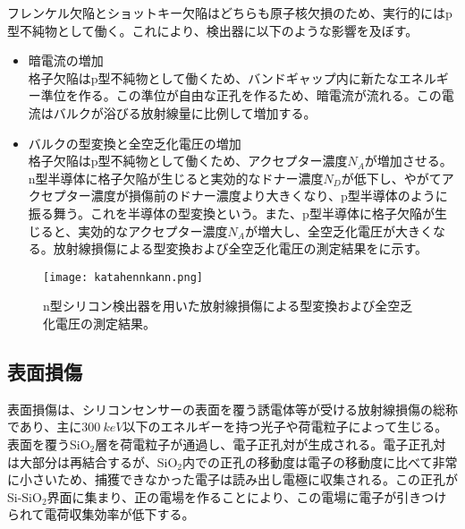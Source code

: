 フレンケル欠陥とショットキー欠陥はどちらも原子核欠損のため、実行的にはp型不純物として働く。これにより、検出器に以下のような影響を及ぼす。
\begin{itemize}
  \item 暗電流の増加\\
  格子欠陥はp型不純物として働くため、バンドギャップ内に新たなエネルギー準位を作る。この準位が自由な正孔を作るため、暗電流が流れる。この電流はバルクが浴びる放射線量に比例して増加する。
  \item バルクの型変換と全空乏化電圧の増加\\
  格子欠陥はp型不純物として働くため、アクセプター濃度$N_A$が増加させる。n型半導体に格子欠陥が生じると実効的なドナー濃度$N_D$が低下し、やがてアクセプター濃度が損傷前のドナー濃度より大きくなり、p型半導体のように振る舞う。これを半導体の型変換という。また、p型半導体に格子欠陥が生じると、実効的なアクセプター濃度$N_A$が増大し、全空乏化電圧が大きくなる。放射線損傷による型変換および全空乏化電圧の測定結果をに示す。
\end{itemize}
\begin{figure}[tbp]
  \centering
  \texttt{[image: katahennkann.png]}
  \caption[放射線損傷による型変換および全空乏化電圧の測定結果]{n型シリコン検出器を用いた放射線損傷による型変換および全空乏化電圧の測定結果\cite{typeinversion}。}
  \label{fig:katahennkann}
\end{figure}



\subsection{表面損傷}
\label{sec:hyoumen}
表面損傷は、シリコンセンサーの表面を覆う誘電体等が受ける放射線損傷の総称であり、主に$300\ \si{keV}$以下のエネルギーを持つ光子や荷電粒子によって生じる。表面を覆うSiO$_2$層を荷電粒子が通過し、電子正孔対が生成される。電子正孔対は大部分は再結合するが、SiO$_2$内での正孔の移動度は電子の移動度に比べて非常に小さいため、捕獲できなかった電子は読み出し電極に収集される。この正孔がSi-SiO$_2$界面に集まり、正の電場を作ることにより、この電場に電子が引きつけられて電荷収集効率が低下する。


